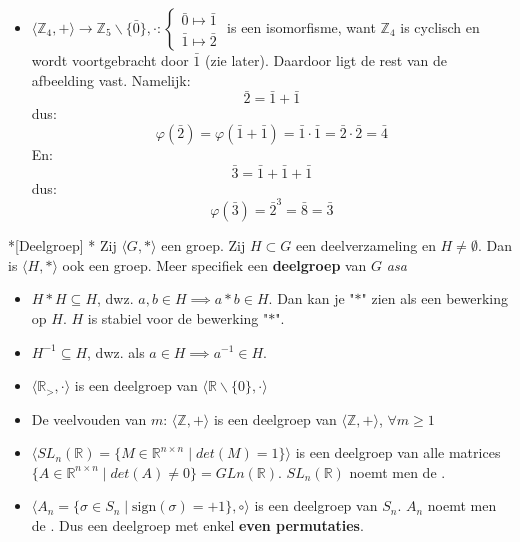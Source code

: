 \begin{itemize}
    \item $\langle \mathbb{Z}_4,+ \rangle \to \mathbb{Z}_5\backslash\{\bar{0}\},\cdot : \begin{cases}
        \bar{0} \mapsto \bar{1} \\
        \bar{1} \mapsto \bar{2}
    \end{cases}$ is een isomorfisme, want $\mathbb{Z}_4$ is cyclisch en wordt voortgebracht door $\bar{1}$ (zie later). Daardoor ligt de rest van de afbeelding vast. Namelijk:
    \begin{equation*}
        \bar{2} = \bar{1} + \bar{1}
    \end{equation*}
    dus:
    \begin{equation*}
        \varphi(\bar{2}) = \varphi(\bar{1} + \bar{1}) = \bar{1} \cdot \bar{1} = \bar{2} \cdot \bar{2} = \bar{4}
    \end{equation*}
    En:
    \begin{equation*}
        \bar{3} = \bar{1} + \bar{1} + \bar{1}
    \end{equation*}
    dus:
    \begin{equation*}
        \varphi(\bar{3}) = \bar{2}^3 = \bar{8} = \bar{3}
    \end{equation*}
\end{itemize}

\begin{nicetheorem}*[Deelgroep]\label{theo:H3_deelgroep}
    \nextpart[]*
    Zij $\langle G,* \rangle$ een groep. Zij $H \subset G$ een deelverzameling en $H \neq \emptyset$. Dan is $\langle H,* \rangle$ ook een groep. Meer specifiek een \textcolor{red!75!black}{\textbf{deelgroep}} van $G$ \emph{asa}
    \begin{itemize}
        \item $H*H \subseteq H$, dwz. $a,b \in H \implies a*b \in H$. Dan kan je "$*$" zien als een bewerking op $H$. $H$ is stabiel voor de bewerking "$*$".
        \item $H^{-1} \subseteq H$, dwz. als $a \in H \implies a^{-1} \in H$.
    \end{itemize}
\end{nicetheorem}

\textbf{}
\begin{itemize}
    \item $\langle \mathbb{R}_{>},\cdot \rangle$ is een deelgroep van $\langle \mathbb{R}\backslash\{0\},\cdot \rangle$
    \item De veelvouden van $m$: $\langle \mathbb{Z},+\rangle$ is een deelgroep van $\langle\mathbb{Z},+\rangle$, $\forall m \ge 1$
    \item $\langle SL_n(\mathbb{R}) = \{ M \in \mathbb{R}^{n \times n} \mid det(M)=1 \} \rangle$ is een deelgroep van alle matrices $\{A \in \mathbb{R}^{n \times n} \mid det(A) \neq 0\} = GLn(\mathbb{R})$. $SL_n(\mathbb{R})$ noemt men de .
    \item $\langle A_n = \{\sigma \in S_n \mid \text{sign}(\sigma)=+1\}, \circ \rangle$ is een deelgroep van $S_n$. $A_n$ noemt men de \newline{}. Dus een deelgroep met enkel \textbf{even permutaties}.
\end{itemize}

